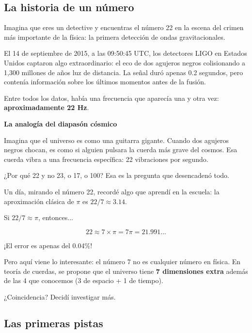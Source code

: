 \documentclass[12pt,a4paper,openany]{book}
\begin{document}
\begin{nivelnarrativo}

\section*{La historia de un número}

Imagina que eres un detective y encuentras el número 22 en la escena del crimen más importante de la física: la primera detección de ondas gravitacionales.

El 14 de septiembre de 2015, a las 09:50:45 UTC, los detectores LIGO en Estados Unidos captaron algo extraordinario: el eco de dos agujeros negros colisionando a 1,300 millones de años luz de distancia. La señal duró apenas 0.2 segundos, pero contenía información sobre los últimos momentos antes de la fusión.

Entre todos los datos, había una frecuencia que aparecía una y otra vez: \textbf{aproximadamente 22 Hz}.

\begin{analogiabox}
\textbf{La analogía del diapasón cósmico}

Imagina que el universo es como una guitarra gigante. Cuando dos agujeros negros chocan, es como si alguien pulsara la cuerda más grave del cosmos. Esa cuerda vibra a una frecuencia específica: 22 vibraciones por segundo.

¿Por qué 22 y no 23, o 17, o 100? Esa es la pregunta que desencadenó todo.
\end{analogiabox}

Un día, mirando el número 22, recordé algo que aprendí en la escuela: la aproximación clásica de $\pi$ es $22/7 \approx 3.14$.

Si $22/7 \approx \pi$, entonces...

\begin{equation}
    22 \approx 7 \times \pi = 7\pi = 21.991...
\end{equation}

¡El error es apenas del 0.04\%!

Pero aquí viene lo interesante: el número 7 no es cualquier número en física. En teoría de cuerdas, se propone que el universo tiene \textbf{7 dimensiones extra} además de las 4 que conocemos (3 de espacio + 1 de tiempo).

¿Coincidencia? Decidí investigar más.

\subsection*{Las primeras pistas}


\end{nivelnarrativo}
\end{document}
